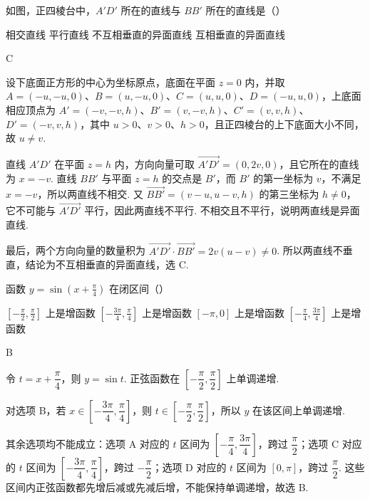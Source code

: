 \documentclass[UTF8,a4paper,oneside,11pt]{ctexbook}
\begin{document}
\begin{problem}
如图，正四棱台中，\(A'D'\) 所在的直线与 \(BB'\) 所在的直线是（\quad）


\choices
    {相交直线}
    {平行直线}
    {不互相垂直的异面直线}
    {互相垂直的异面直线}
\end{problem}

\begin{answer}
C
\end{answer}

\begin{solution}
设下底面正方形的中心为坐标原点，底面在平面 \(z=0\) 内，并取
\(A=(-u,-u,0)\)、\(B=(u,-u,0)\)、\(C=(u,u,0)\)、\(D=(-u,u,0)\)，上底面相应顶点为
\(A'=(-v,-v,h)\)、\(B'=(v,-v,h)\)、\(C'=(v,v,h)\)、\(D'=(-v,v,h)\)，其中 \(u>0\)、\(v>0\)、\(h>0\)，且正四棱台的上下底面大小不同，故 \(u\ne v\).

直线 \(A'D'\) 在平面 \(z=h\) 内，方向向量可取 \(\overrightarrow{A'D'}=(0,2v,0)\)，且它所在的直线为 \(x=-v\). 直线 \(BB'\) 与平面 \(z=h\) 的交点是 \(B'\)，而 \(B'\) 的第一坐标为 \(v\)，不满足 \(x=-v\)，所以两直线不相交. 又 \(\overrightarrow{BB'}=(v-u,u-v,h)\) 的第三坐标为 \(h\ne0\)，它不可能与 \(\overrightarrow{A'D'}\) 平行，因此两直线不平行. 不相交且不平行，说明两直线是异面直线.

最后，两个方向向量的数量积为
\(\overrightarrow{A'D'}\cdot\overrightarrow{BB'}=2v(u-v)\ne0\). 所以两直线不垂直，结论为不互相垂直的异面直线，选 C.
\end{solution}

\begin{problem}
函数 \(y = \sin\left(x+\frac{\pi}{4}\right)\) 在闭区间（\quad）

\choices
    {\(\left[-\frac{\pi}{2}, \frac{\pi}{2}\right]\) 上是增函数}
    {\(\left[-\frac{3\pi}{4}, \frac{\pi}{4}\right]\) 上是增函数}
    {\([-\pi,0]\) 上是增函数}
    {\(\left[-\frac{\pi}{4}, \frac{3\pi}{4}\right]\) 上是增函数}
\end{problem}

\begin{answer}
B
\end{answer}

\begin{solution}
令 \(t=x+\dfrac\pi4\)，则 \(y=\sin t\). 正弦函数在
\(\left[-\dfrac\pi2,\dfrac\pi2\right]\) 上单调递增.

对选项 B，若 \(x\in\left[-\dfrac{3\pi}{4},\dfrac\pi4\right]\)，则
\(t\in\left[-\dfrac\pi2,\dfrac\pi2\right]\)，所以 \(y\) 在该区间上单调递增.

其余选项均不能成立：选项 A 对应的 \(t\) 区间为 \(\left[-\dfrac\pi4,\dfrac{3\pi}4\right]\)，跨过 \(\dfrac\pi2\)；选项 C 对应的 \(t\) 区间为 \(\left[-\dfrac{3\pi}4,\dfrac\pi4\right]\)，跨过 \(-\dfrac\pi2\)；选项 D 对应的 \(t\) 区间为 \([0,\pi]\)，跨过 \(\dfrac\pi2\). 这些区间内正弦函数都先增后减或先减后增，不能保持单调递增，故选 B.
\end{solution}
\end{document}
